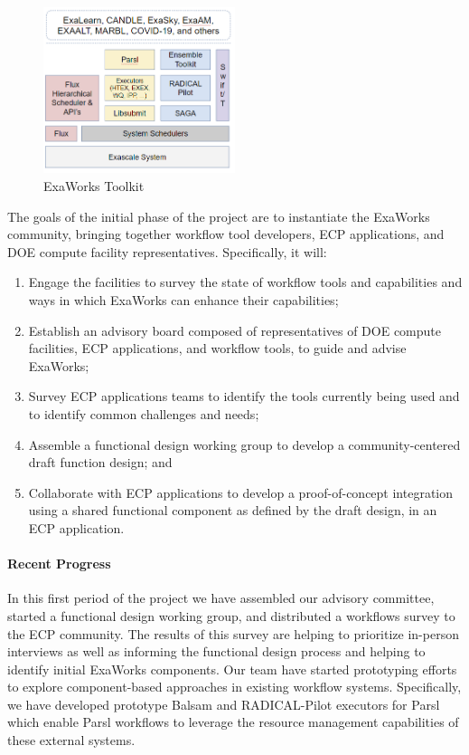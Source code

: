 \begin{figure}
\begin{center}
    \includegraphics[width=0.5\textwidth]{projects/2.3.5-Ecosystem/2.3.5.10-ExaWorks/exaworks.png}
  \end{center}
  \caption{ExaWorks Toolkit\label{fig:arch}}
\end{figure} 

The goals of the initial phase of the project are to instantiate the ExaWorks community, 
bringing together workflow tool developers, ECP applications, and DOE compute facility representatives.  Specifically, it will:
\begin{enumerate}
    \item Engage the facilities to survey the state of workflow tools and capabilities and ways in which ExaWorks can enhance their capabilities;
    \item Establish an advisory board composed of representatives of DOE compute facilities, ECP applications, and workflow tools, to guide and advise ExaWorks;
    \item Survey ECP applications teams to identify the tools currently being used and to identify common challenges and needs;
    \item Assemble a functional design working group to develop a community-centered draft function design; and
    \item Collaborate with ECP applications to develop a proof-of-concept integration using a shared functional component as defined by the draft design, in an ECP application.
\end{enumerate}

\paragraph{Recent Progress}
In this first period of the project we have
assembled our advisory committee, 
started a functional design working group, and distributed a workflows
survey to the ECP community. The results of this survey are helping
to prioritize in-person interviews as well as informing the 
functional design process and helping to identify initial ExaWorks components. 
Our team have started prototyping efforts to explore 
component-based approaches in existing workflow systems. Specifically, 
we have developed prototype Balsam and RADICAL-Pilot executors for Parsl
which enable Parsl workflows to leverage the resource management 
capabilities of these external systems.


